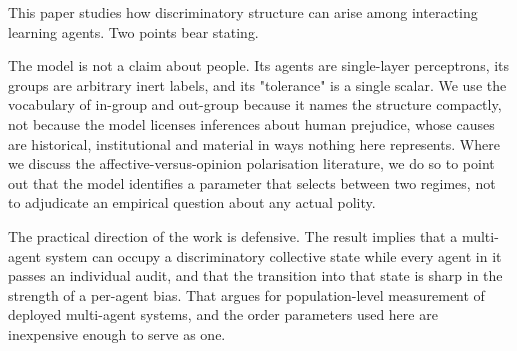 This paper studies how discriminatory structure can arise among interacting
learning agents. Two points bear stating.

The model is not a claim about people. Its agents are single-layer perceptrons,
its groups are arbitrary inert labels, and its "tolerance" is a single scalar. We
use the vocabulary of in-group and out-group because it names the structure
compactly, not because the model licenses inferences about human prejudice, whose
causes are historical, institutional and material in ways nothing here
represents. Where we discuss the affective-versus-opinion polarisation
literature, we do so to point out that the model identifies a parameter that
selects between two regimes, not to adjudicate an empirical question about any
actual polity.

The practical direction of the work is defensive. The result implies that a
multi-agent system can occupy a discriminatory collective state while every agent
in it passes an individual audit, and that the transition into that state is
sharp in the strength of a per-agent bias. That argues for population-level
measurement of deployed multi-agent systems, and the order parameters used here
are inexpensive enough to serve as one.
